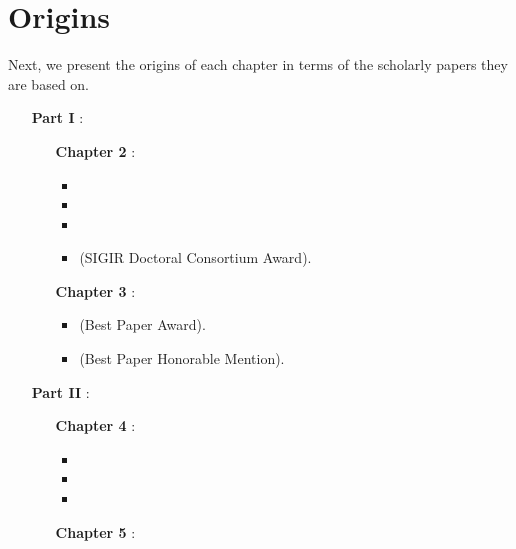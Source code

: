 \section{Origins}
Next, we present the origins of each chapter in terms of the scholarly papers they are based on.
\begin{itemize}
    \item[\textbf{Part I}]: \emph{}
%  
    \begin{itemize}
        \item[\textbf{Chapter 2}]: \emph{}
        \begin{itemize}
            \item {}
            \item {}
            \item {}
            \item {} (SIGIR Doctoral Consortium Award).
        \end{itemize}
    \end{itemize}
%
    \begin{itemize}
        \item[\textbf{Chapter 3}]: \emph{}
        \begin{itemize}
            \item {} (Best Paper Award).
            \item {} (Best Paper Honorable Mention).
        \end{itemize}
    \end{itemize}
%  
    \item[\textbf{Part II}]: \emph{}
%  
    \begin{itemize}
        \item[\textbf{Chapter 4}]: \emph{}
        \begin{itemize}
            \item {}
            \item {}
            \item {}
        \end{itemize}
    \end{itemize}
%
    \begin{itemize}
        \item[\textbf{Chapter 5}]: \emph{}
        \begin{itemize}

\end{itemize}
\end{itemize}
\end{itemize}
